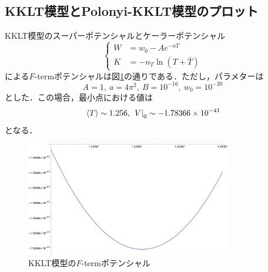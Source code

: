 \documentclass[a4paper,uplatex,dvipdfmx,10pt]{jsarticle}
\theoremstyle{definition}
\begin{document}
\subsection{KKLT模型とPolonyi-KKLT模型のプロット}

KKLT模型のスーパーポテンシャルとケーラーポテンシャル
\begin{equation}
   \left\{
      \begin{alignedat}{1}
         W
         &=
         w_{0}
         -
         Ae^{-aT}
         \\
         K
         &=
         -n_{T}\ln(T+\bar{T})
      \end{alignedat}
   \right.
   \nonumber
\end{equation}
による$F$-termポテンシャルは図\ref{plot_KKLT_model}の通りである．ただし，パラメターは
\begin{equation}
   A=1
   ,\ 
   a=4 \pi^2
   ,\ 
   B=10^{-16}
   ,\ 
   w_{0}=10^{-20}
   \nonumber
\end{equation}
とした．この場合，最小点における値は
\begin{equation}
   \ev*{T}
   \sim
   1.256
   ,\ 
   \left.V\right|_{0}
   \sim
   -1.78366\times 10^{-41}
   \label{minimum_KKLT}
\end{equation}
となる．

\begin{figure}[ht]
   \centering
   \includegraphics[width=0.8\textwidth]{fig/kklt_minimum.jpg}
   \caption{KKLT模型の$F$-termポテンシャル}
   \label{plot_KKLT_model}
\end{figure}
\end{document}
